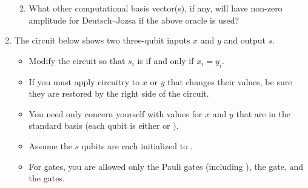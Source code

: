 \documentclass[12pt]{article}
\begin{document}
\begin{enumerate}[font=\bfseries]
\begin{enumerate}[label=\theenumi.\arabic*]
    \Blank[4in]{}
    \item  What other computational basis vector(s), if any, will have non-zero amplitude for Deutsch--Jozsa if the above oracle is used?  
    
    \Blank[4in]{}
\end{enumerate}
\item{} The circuit below shows two three-qubit inputs $x$ and $y$ and output $s$.
\begin{itemize}
    \item Modify the circuit so that $s_i$ is \QOne{} if and only if $x_{i}=y_{i}$.  
    \item If you must apply circuitry to $x$ or $y$ that changes their values, be sure they are restored by the right side of the circuit.
    \item You need only concern yourself with values for $x$ and $y$ that are in the standard \PauliZ{} basis (each qubit is either \QZero{} or \QOne{}).
    \item Assume the $s$ qubits are each initialized to \QZero{}.
    \item For gates, you are allowed only the
    Pauli gates (including \Hadamard{}), the  gate, and the  gates.
\end{itemize}
\BigSkip{}
\begin{center}
\Vskip{-3em}
\end{center}


\end{enumerate}
\end{document}
